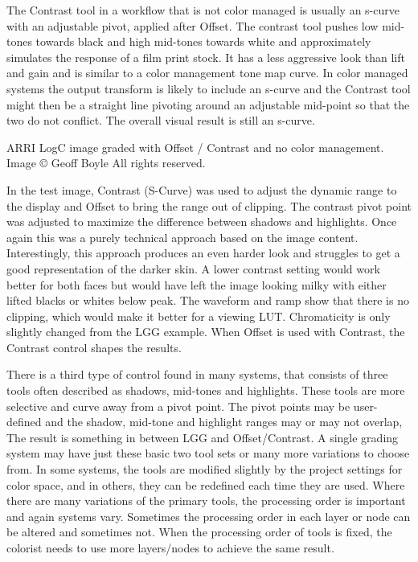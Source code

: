 The Contrast tool in a workflow that is not color managed is usually an s-curve with an adjustable pivot, applied after Offset. The contrast tool pushes low mid-tones towards black and high mid-tones towards white and approximately simulates the response of a film print stock. It has a less aggressive look than lift and gain and is similar to a color management tone map curve. In color managed systems the output transform is likely to include an s-curve and the Contrast tool might then be a straight line pivoting around an adjustable mid-point so that the two do not conflict. The overall visual result is still an s-curve.


ARRI LogC image graded with Offset / Contrast and no color management. Image © Geoff Boyle All rights reserved.

In the test image, Contrast (S-Curve) was used to adjust the dynamic range to the display and  Offset to bring the range out of clipping. The contrast pivot point was adjusted to maximize the difference between shadows and highlights. Once again this was a purely technical approach based on the image content. Interestingly, this approach produces an even harder look and struggles to get a good representation of the darker skin. A lower contrast setting would work better for both faces but would have left the image looking milky with either lifted blacks or whites below peak. The waveform and ramp show that there is no clipping, which would make it better for a viewing LUT. Chromaticity is only slightly changed from the LGG example. When Offset is used with Contrast, the Contrast control shapes the results.

There is a third type of control found in many systems, that consists of three tools often described as shadows, mid-tones and highlights. These tools are more selective and curve away from a pivot point. The pivot points may be user-defined and the shadow, mid-tone and highlight ranges may or may not overlap, The result is something in between LGG and Offset/Contrast. A single grading system may have just these basic two tool sets or many more variations to choose from. In some systems, the tools are modified slightly by the project settings for color space, and in others, they can be redefined each time they are used. Where there are many variations of the primary tools, the processing order is important and again systems vary. Sometimes the processing order in each layer or node can be altered and sometimes not. When the processing order of tools is fixed, the colorist needs to use more layers/nodes to achieve the same result.

